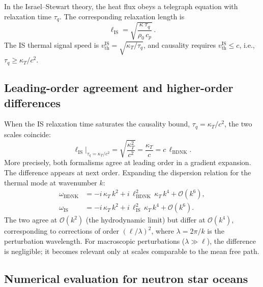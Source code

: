 In the Israel--Stewart theory, the heat flux obeys a telegraph equation
with relaxation time $\tau_q$.  The corresponding relaxation length is
\begin{equation}
\label{eq:rel2-relax-is}
\ell_{\mathrm{IS}} = \sqrt{\frac{\kappa\,\tau_q}{\rho_0\,c_p}}\,.
\end{equation}
The IS thermal signal speed is $v_{\mathrm{th}}^{\mathrm{IS}} =
\sqrt{\kappa_T/\tau_q}$, and causality requires $v_{\mathrm{th}}^{\mathrm{IS}}
\leq c$, i.e., $\tau_q \geq \kappa_T/c^2$.

\subsection{Leading-order agreement and higher-order differences}

When the IS relaxation time saturates the causality bound,
$\tau_q = \kappa_T/c^2$, the two scales coincide:
\begin{equation}
\label{eq:rel2-relax-agreement}
\ell_{\mathrm{IS}}\big|_{\tau_q = \kappa_T/c^2}
  = \sqrt{\frac{\kappa_T^2}{c^2}} = \frac{\kappa_T}{c} = c\,\ell_{\mathrm{BDNK}}.
\end{equation}
More precisely, both formalisms agree at leading order in a gradient
expansion.  The difference appears at next order.  Expanding the
dispersion relation for the thermal mode at wavenumber $k$:
\begin{align}
\omega_{\mathrm{BDNK}} &= -i\,\kappa_T\,k^2
  + i\,\ell_{\mathrm{BDNK}}^2\,\kappa_T\,k^4
  + \mathcal{O}(k^6), \label{eq:rel2-relax-bdnk-disp} \\[4pt]
\omega_{\mathrm{IS}} &= -i\,\kappa_T\,k^2
  + i\,\ell_{\mathrm{IS}}^2\,\kappa_T\,k^4
  + \mathcal{O}(k^6). \label{eq:rel2-relax-is-disp}
\end{align}
The two agree at $\mathcal{O}(k^2)$ (the hydrodynamic limit) but differ
at $\mathcal{O}(k^4)$, corresponding to corrections of order
$(\ell/\lambda)^2$, where $\lambda = 2\pi/k$ is the perturbation
wavelength.  For macroscopic perturbations ($\lambda \gg \ell$), the
difference is negligible; it becomes relevant only at scales comparable
to the mean free path.

\subsection{Numerical evaluation for neutron star oceans}

